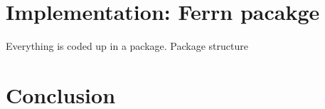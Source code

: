 \documentclass[12pt]{article}
\begin{document}
\hypertarget{implementation-ferrn-pacakge}{%
\section{Implementation: Ferrn
pacakge}\label{implementation-ferrn-pacakge}}

Everything is coded up in a package. Package structure

\hypertarget{conclusion}{%
\section{Conclusion}\label{conclusion}}

\clearpage



\end{document}
